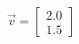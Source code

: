 \documentclass[preview]{standalone}
\begin{document}
\begin{align*}
\vec{v} = \begin{bmatrix} 2.0 \\ 1.5 \end{bmatrix}
\end{align*}
\end{document}
